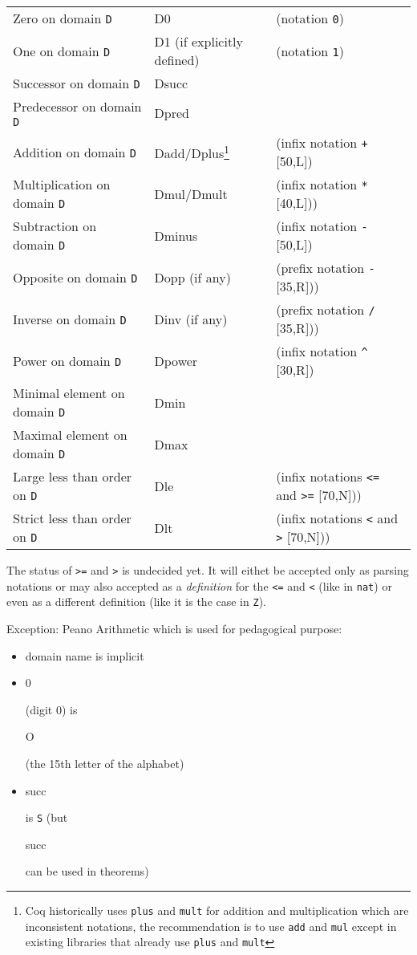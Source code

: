 \documentclass[a4paper]{article}
\newcommand\term[1]{\begin{tt}#1\end{tt}}
\newcommand\D{\texttt{D}}
\begin{document}
\begin{minipage}{6in}
\renewcommand{\thefootnote}{\thempfootnote}  %
\begin{tabular}{lll}
Zero on domain {\D} & D0 & (notation \verb=0=)\\
One on domain {\D} & D1 (if explicitly defined) & (notation \verb=1=)\\
Successor on domain {\D} & Dsucc\\
Predecessor on domain {\D} & Dpred\\
Addition on domain {\D} & Dadd/Dplus\footnote{Coq historically uses \texttt{plus} and \texttt{mult} for addition and multiplication which are inconsistent notations, the recommendation is to use \texttt{add} and \texttt{mul} except in existing libraries that already use \texttt{plus} and \texttt{mult}}
 & (infix notation \verb=+= [50,L])\\
Multiplication on domain {\D} & Dmul/Dmult\footnotemark[\value{footnote}] & (infix notation \verb=*= [40,L]))\\
Subtraction on domain {\D} & Dminus & (infix notation \verb=-= [50,L])\\
Opposite on domain {\D} & Dopp (if any) & (prefix notation \verb=-= [35,R]))\\
Inverse on domain {\D} & Dinv (if any) & (prefix notation \verb=/= [35,R]))\\
Power on domain {\D} & Dpower & (infix notation \verb=^= [30,R])\\
Minimal element on domain {\D} & Dmin\\
Maximal element on domain {\D} & Dmax\\
Large less than order on {\D} & Dle & (infix notations \verb!<=! and \verb!>=! [70,N]))\\
Strict less than order on {\D} & Dlt & (infix notations \verb=<= and \verb=>= [70,N]))\\
\end{tabular}
\bigskip
\end{minipage}

\bigskip

The status of \verb!>=! and \verb!>! is undecided yet. It will eithet
be accepted only as parsing notations or may also accepted as a {\em
  definition} for the \verb!<=! and \verb!<! (like in \texttt{nat}) or
even as a different definition (like it is the case in \texttt{Z}).

\bigskip

Exception: Peano Arithmetic which is used for pedagogical purpose:

\begin{itemize}
\item domain name is implicit
\item \term{0} (digit $0$) is \term{O} (the 15th letter of the alphabet)
\item \term{succ} is \verb!S! (but \term{succ} can be used in theorems)
\end{itemize}
\end{document}
